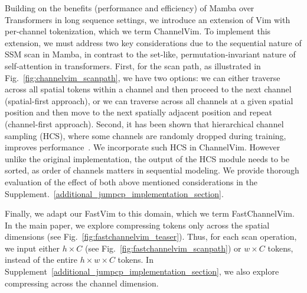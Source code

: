 Building on the benefits (performance and efficiency) of Mamba over Transformers in long sequence settings, we introduce an extension of Vim with per-channel tokenization, which we term ChannelVim. To implement this extension, we must address two key considerations due to the sequential nature of SSM scan in Mamba, in contrast to the set-like, permutation-invariant nature of self-attention in transformers. First, for the scan path, as illustrated in Fig.~\ref{fig:channelvim_scanpath}, we have two options: we can either traverse across all spatial tokens within a channel and then proceed to the next channel (spatial-first approach), or we can traverse across all channels at a given spatial position and then move to the next spatially adjacent position and repeat (channel-first approach). Second, it has been shown that hierarchical channel sampling (HCS), where some channels are randomly dropped during training, improves performance~\cite{channelvit}. We incorporate such HCS in ChannelVim. However unlike the original implementation, the output of the HCS module needs to be sorted, as order of channels matters in sequential modeling. We provide thorough evaluation of the effect of both above mentioned considerations in the Supplement.~\ref{additional_jumpcp_implementation_section}.

Finally, we adapt our FastVim to this domain, which we term FastChannelVim. In the main paper, we explore compressing tokens only across the spatial dimensions  (see Fig.~\ref{fig:fastchannelvim_teaser}). Thus, for each scan operation, we input either $h \times C$ (see Fig.~\ref{fig:fastchannelvim_scanpath}) or $w \times C$ tokens, instead of the entire $h \times w \times C$ tokens. In Supplement~\ref{additional_jumpcp_implementation_section}, we also explore compressing across the channel dimension.




